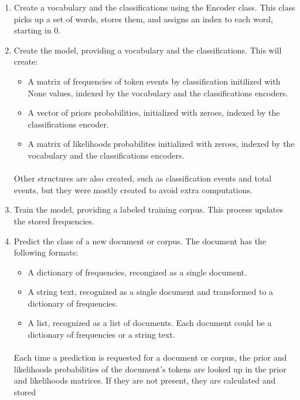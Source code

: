 \documentclass{article}
\begin{document}
\begin{enumerate}
    \item Create a vocabulary and the classifications using the Encoder class. This class picks up a set of words, stores them, and assigns an index to each word, starting in 0.
    \item Create the model, providing a vocabulary and the classifications. This will create:
        \begin{itemize}
            \item A matrix of frequencies of token events by classification initilized with None values, indexed by the vocabulary and the classifications encoders.
            \item A vector of priors probabilities, initialized with zeroes, indexed by the classifications encoder.
            \item A matrix of likelihoods probabilites initialized with zeroes, indexed by the vocabulary and the classifications encoders.
        \end{itemize}
        
        \paragraph{} Other structures are also created, such as classification events and total events, but they were mostly created to avoid extra computations.
    \item Train the model, providing a labeled training corpus. This process updates the stored frequencies.
    \item Predict the class of a new document or corpus. The document has the following formats:
        \begin{itemize}
            \item A dictionary of frequencies, recongized as a single document.
            \item A string text, recognized as a single document and transformed to a dictionary of frequencies.
            \item A list, recognized as a list of documents. Each document could be a dictionary of frequencies or a string text.
        \end{itemize}
    
    \paragraph{} Each time a prediction is requested for a document or corpus, the prior and likelihoods probabilities of the document's tokens are looked up in the prior and likelihoods matrices. If they are not present, they are calculated and stored
\end{enumerate}
\end{document}
